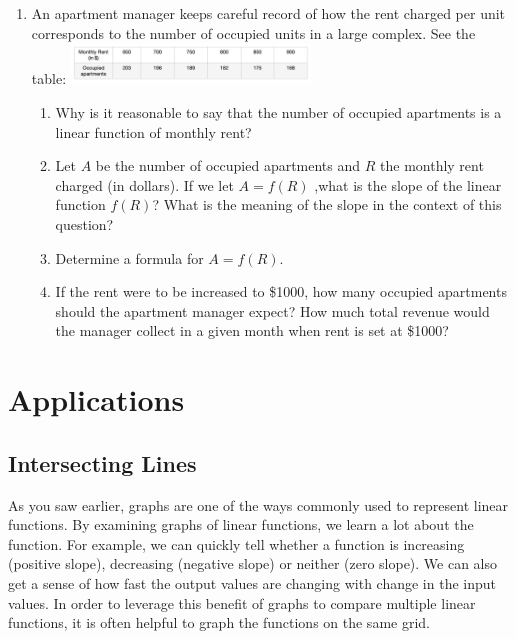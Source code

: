 \documentclass[
  letterpaper,
  DIV=11,
  numbers=noendperiod]{scrreprt}
\providecommand{\tightlist}{%
  \setlength{\itemsep}{0pt}\setlength{\parskip}{0pt}}\usepackage{longtable,booktabs,array}
\begin{document}
\begin{enumerate}
\def\labelenumi{\arabic{enumi}.}
\setcounter{enumi}{4}
\item
  An apartment manager keeps careful record of how the rent charged per
  unit corresponds to the number of occupied units in a large complex.
  See the table:
  \includegraphics[width=0.5\textwidth,height=\textheight]{images/h.jpeg}

  \begin{enumerate}
  \def\labelenumii{\alph{enumii}.}
  \tightlist
  \item
    Why is it reasonable to say that the number of occupied apartments
    is a linear function of monthly rent?
  \item
    Let \(A\) be the number of occupied apartments and \(R\) the monthly
    rent charged (in dollars). If we let \(A=f(R)\) ,what is the slope
    of the linear function \(f(R)\)? What is the meaning of the slope in
    the context of this question?
  \item
    Determine a formula for \(A=f(R)\).
  \item
    If the rent were to be increased to \$1000, how many occupied
    apartments should the apartment manager expect? How much total
    revenue would the manager collect in a given month when rent is set
    at \$1000?
  \end{enumerate}
\end{enumerate}

\hypertarget{applications}{%
\chapter{Applications}\label{applications}}

\hypertarget{intersecting-lines}{%
\section{Intersecting Lines}\label{intersecting-lines}}

As you saw earlier, graphs are one of the ways commonly used to
represent linear functions. By examining graphs of linear functions, we
learn a lot about the function. For example, we can quickly tell whether
a function is increasing (positive slope), decreasing (negative slope)
or neither (zero slope). We can also get a sense of how fast the output
values are changing with change in the input values. In order to
leverage this benefit of graphs to compare multiple linear functions, it
is often helpful to graph the functions on the same grid.
\end{document}
